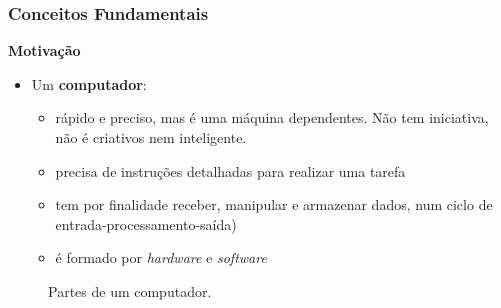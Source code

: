 \begin{frame}
	\frametitle{Conceitos Fundamentais}
	\textbf{Motivação}
	\begin{itemize}
		\item Um \textbf{computador}:
		\begin{itemize}
			\item rápido e preciso, mas é uma máquina dependentes. Não tem iniciativa, não é criativos nem inteligente.
			\item precisa de instruções detalhadas para realizar uma tarefa
			\item tem por finalidade receber, manipular e armazenar dados, num ciclo de entrada-processamento-saída)
			\item é formado por \textit{hardware} e \textit{software}
		\end{itemize}
	\end{itemize}


	\begin{figure}
		\centering
		\caption{Partes de um computador.}
		\label{fig:hardaware-software}
	\end{figure}
\end{frame}




